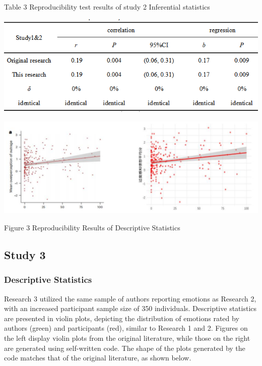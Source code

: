 \documentclass[
  man]{apa6}
\begin{document}
\begin{center}
Table 3 Reproducibility test results of study 2 Inferential statistics
\end{center}
\begin{center}
\includegraphics{study1_2_Reproducibility_Plot.png}
\end{center}
\begin{center}
\includegraphics{study1_2_Scatter_Plot.png}
\end{center}
\begin{center}
Figure 3 Reproducibility Results of Descriptive Statistics 
\end{center}

\hypertarget{study-3}{%
\subsection{Study 3}\label{study-3}}

\hypertarget{descriptive-statistics-2}{%
\subsubsection{Descriptive Statistics}\label{descriptive-statistics-2}}

Research 3 utilized the same sample of authors reporting emotions as Research 2, with an increased participant sample size of 350 individuals. Descriptive statistics are presented in violin plots, depicting the distribution of emotions rated by authors (green) and participants (red), similar to Research 1 and 2. Figures on the left display violin plots from the original literature, while those on the right are generated using self-written code. The shape of the plots generated by the code matches that of the original literature, as shown below.
\end{document}
